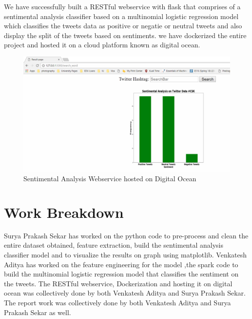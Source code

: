 We have successfully built a RESTful webservice with flask that comprises of a 
sentimental analysis classifier based on a multinomial logistic regression 
model which classifies the tweets data as positive or negatie or neutral 
tweets and also display the split of the tweets based on sentiments. 
we have dockerized the entire project and hosted it on a cloud platform known as 
digital ocean. 

\begin{figure}[!ht]
\centering\includegraphics[width=\columnwidth]{images/result.png}
\caption{Sentimental Analysis Webservice hosted on Digital Ocean}
\label{f:Sentimental Analysis Webservice }
\end{figure}


\section{Work Breakdown}
Surya Prakash Sekar has worked on the python code to pre-process and clean the 
entire dataset 
obtained, feature extraction, build the sentimental analysis classifier model 
and to visualize the results on graph using matplotlib. Venkatesh Aditya has 
worked on the feature engineering for the model ,the spark code to build the 
multinomial logistic regression model that 
classifies the sentiment on the tweets.
The RESTful webservice, Dockerization and hosting it on digital ocean was 
collectively done by both Venkatesh Aditya and Surya Prakash Sekar. 
The report work was collectively done by both Venkatesh Aditya and Surya 
Prakash Sekar as well.

